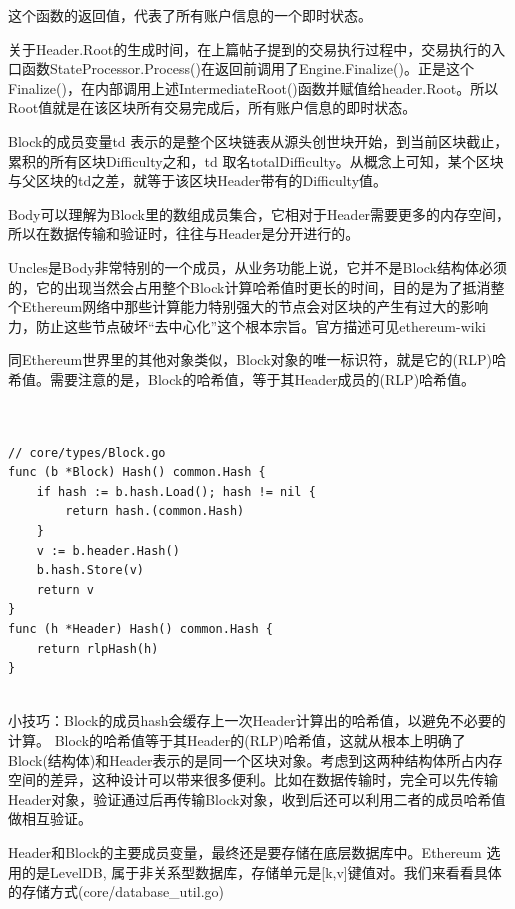 \documentclass[UTF8]{ctexart}
\begin{document}
这个函数的返回值，代表了所有账户信息的一个即时状态。

关于Header.Root的生成时间，在上篇帖子提到的交易执行过程中，交易执行的入口函数StateProcessor.Process()在返回前调用了Engine.Finalize()。正是这个Finalize()，在内部调用上述IntermediateRoot()函数并赋值给header.Root。所以Root值就是在该区块所有交易完成后，所有账户信息的即时状态。


Block的成员变量td 表示的是整个区块链表从源头创世块开始，到当前区块截止，累积的所有区块Difficulty之和，td 取名totalDifficulty。从概念上可知，某个区块与父区块的td之差，就等于该区块Header带有的Difficulty值。

Body可以理解为Block里的数组成员集合，它相对于Header需要更多的内存空间，所以在数据传输和验证时，往往与Header是分开进行的。

Uncles是Body非常特别的一个成员，从业务功能上说，它并不是Block结构体必须的，它的出现当然会占用整个Block计算哈希值时更长的时间，目的是为了抵消整个Ethereum网络中那些计算能力特别强大的节点会对区块的产生有过大的影响力，防止这些节点破坏“去中心化”这个根本宗旨。官方描述可见ethereum-wiki


同Ethereum世界里的其他对象类似，Block对象的唯一标识符，就是它的(RLP)哈希值。需要注意的是，Block的哈希值，等于其Header成员的(RLP)哈希值。

\begin{lstlisting}


// core/types/Block.go
func (b *Block) Hash() common.Hash {
    if hash := b.hash.Load(); hash != nil {
        return hash.(common.Hash)
    }
    v := b.header.Hash()
    b.hash.Store(v)
    return v
}
func (h *Header) Hash() common.Hash {
    return rlpHash(h)
}


\end{lstlisting}

小技巧：Block的成员hash会缓存上一次Header计算出的哈希值，以避免不必要的计算。
Block的哈希值等于其Header的(RLP)哈希值，这就从根本上明确了Block(结构体)和Header表示的是同一个区块对象。考虑到这两种结构体所占内存空间的差异，这种设计可以带来很多便利。比如在数据传输时，完全可以先传输Header对象，验证通过后再传输Block对象，收到后还可以利用二者的成员哈希值做相互验证。


Header和Block的主要成员变量，最终还是要存储在底层数据库中。Ethereum 选用的是LevelDB, 属于非关系型数据库，存储单元是[k,v]键值对。我们来看看具体的存储方式(core/database\_util.go)
\end{document}
